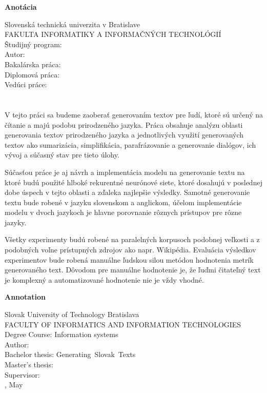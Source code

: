 \newpage
\thispagestyle{plain}
\begin{center}
\begin{Large}
\textbf{Anotácia} \\
\end{Large}
\end{center}
Slovenská technická univerzita v Bratislave \\
FAKULTA INFORMATIKY A INFORMAČNÝCH TECHNOLÓGIÍ \\
\noindent
Študijný program: \Program \\
\noindent
Autor: \Author \\
{
	{Bakalárska práca: }\Title \\
}
{
	{Diplomová práca: }\Title \\
}
Vedúci práce: \Supervisor \\
\Month{ }\Year \\
\noindent
\\

V tejto práci sa budeme zaoberať generovaním textov pre ľudí, ktoré sú určený na čítanie a majú podobu prirodzeného jazyka. Práca obsahuje analýzu oblasti generovania textov prirodzeného jazyka a jednotlivých využití generovaných textov ako sumarizácia, simplifikácia, parafrázovanie a generovanie dialógov, ich vývoj a súčasný stav pre tieto úlohy.

Súčasťou práce je aj návrh a implementácia modelu na generovanie textu na ktoré budú použité hlboké rekurentné neurónové siete, ktoré dosahujú v poslednej dobe úspech v tejto oblasti a zďaleka najlepšie výsledky. Samotné generovanie textu bude robené v jazyku slovenskom a anglickom, účelom implementácie modelu v dvoch jazykoch je hlavne porovnanie rôznych prístupov pre rôzne jazyky.

Všetky experimenty budú robené na paralelných korpusoch podobnej veľkosti a z podobných voľne prístupných zdrojov ako napr. Wikipédia. Evaluácia výsledkov experimentov bude robená manuálne ľudskou silou metódou hodnotenia metrík generovaného text. Dôvodom pre manuálne hodnotenie je, že ľuďmi čitateľný text je komplexný a automatizované hodnotenie nie je vždy vhodné.

\newpage
\blankpage

\thispagestyle{plain}
\begin{center}
\begin{Large}
\textbf{Annotation} \\
\end{Large}
\end{center}
Slovak University of Technology Bratislava \\
FACULTY OF INFORMATICS AND INFORMATION TECHNOLOGIES \\
\noindent
Degree Course: Information systems \\
\noindent
Author: \Author \\
{
	{Bachelor thesis: }\mbox{Generating Slovak Texts}\\
}
{
	{Master's thesis: }\mbox{} \\
}
Supervisor: \Supervisor \\
\Year, May \\
\noindent
\\

